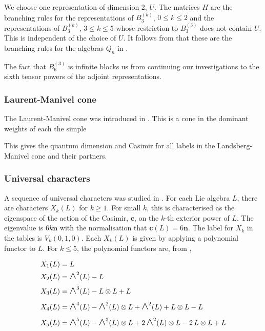 \documentclass[12pt]{amsart}
\providecommand{\nv}{\mathbf{n}}
\providecommand{\casimir}{\mathbf{c}}
\newcommand{\largewedge}{\mbox{\Large $\wedge$}}
\begin{document}
We choose one representation of dimension 2, $U$. The matrices $H$ are the branching
rules for the representations of $B_3^{(k)}$, $0\leqslant k\leqslant 2$ and the
representations of $B_3^{(k)}$, $3\leqslant k\leqslant 5$ whose restriction to $B_3^{(3)}$
does not contain $U$. This is independent of the choice of $U$. It follows from \cite{marin2012}
that these are the branching rules for the algebras $Q_n$ in \cite{marin2022}.

The fact that $B_6^{(3)}$ is infinite blocks us from continuing our investigations to the
sixth tensor powers of the adjoint representations.
 
\subsubsection{Laurent-Manivel cone}
The Laurent-Manivel cone was introduced in \cite{Landsberg2002}. This is a cone in the dominant
weights of each the simple 

This gives the quantum dimension and Casimir for all labels in the Landsberg-Manivel cone and their partners.

\subsubsection{Universal characters}
A sequence of universal characters was studied in \cite{Westbury2006a}. For each Lie algebra $L$, there are characters $X_k(L)$ for $k\geqslant 1$. For small $k$, this is characterised as the 
eigenspace of the action of the Casimir, $\casimir$, on the $k$-th exterior power of $L$. The eigenvalue is $6k\nv$ with the normalisation that $\casimir(L) = 6 \nv$. The label for $X_k$ in the tables is $V_k(0,1,0)$. Each $X_k(L)$ is given by applying a polynomial functor to $L$.
For $k\leqslant 5$, the polynomial functors are, from \cite[(8)]{Westbury2006a},

\begin{align*}
X_1(L) &= L \\
X_2(L) &= \largewedge^2(L) - L \\
X_3(L) &= \largewedge^3(L) - L\otimes L + L \\
X_4(L) &= \largewedge^4(L) - \largewedge^2(L)\otimes L + \largewedge^2(L) + L\otimes L - L \\
X_5(L) &= \largewedge^5(L) - \largewedge^3(L)\otimes L + 2\, \largewedge^2(L)\otimes L - 2\, L\otimes L + L \\
\end{align*}
\end{document}
